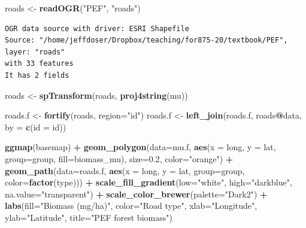\documentclass[
]{krantz}
\makeatletter
\newenvironment{Shaded}{\begin{snugshade}}{\end{snugshade}}
\newcommand{\DataTypeTok}[1]{\textcolor[rgb]{0.27,0.27,0.27}{#1}}
\newcommand{\FloatTok}[1]{\textcolor[rgb]{0.06,0.06,0.06}{#1}}
\newcommand{\KeywordTok}[1]{\textcolor[rgb]{0.27,0.27,0.27}{\textbf{#1}}}
\newcommand{\NormalTok}[1]{#1}
\newcommand{\OperatorTok}[1]{\textcolor[rgb]{0.43,0.43,0.43}{\textbf{#1}}}
\newcommand{\StringTok}[1]{\textcolor[rgb]{0.5,0.5,0.5}{#1}}
\newenvironment{kframe}{%
\medskip{}
\setlength{\fboxsep}{.8em}
 \def\at@end@of@kframe{}%
 \ifinner\ifhmode%
  \def\at@end@of@kframe{\end{minipage}}%
  \begin{minipage}{\columnwidth}%
 \fi\fi%
 \def\FrameCommand##1{\hskip\@totalleftmargin \hskip-\fboxsep
 \colorbox{shadecolor}{##1}\hskip-\fboxsep
     \hskip-\linewidth \hskip-\@totalleftmargin \hskip\columnwidth}%
 \MakeFramed {\advance\hsize-\width
   \@totalleftmargin\z@ \linewidth\hsize
   \@setminipage}}%
 {\par\unskip\endMakeFramed%
 \at@end@of@kframe}
\renewenvironment{Shaded}{\begin{kframe}}{\end{kframe}}
\makeatother
\begin{document}
\begin{Shaded}
\begin{Highlighting}[]
\NormalTok{roads \textless{}{-}}\StringTok{ }\KeywordTok{readOGR}\NormalTok{(}\StringTok{"PEF"}\NormalTok{, }\StringTok{"roads"}\NormalTok{)}
\end{Highlighting}
\end{Shaded}

\begin{verbatim}
OGR data source with driver: ESRI Shapefile 
Source: "/home/jeffdoser/Dropbox/teaching/for875-20/textbook/PEF", layer: "roads"
with 33 features
It has 2 fields
\end{verbatim}

\begin{Shaded}
\begin{Highlighting}[]
\NormalTok{roads \textless{}{-}}\StringTok{ }\KeywordTok{spTransform}\NormalTok{(roads, }\KeywordTok{proj4string}\NormalTok{(mu))}

\NormalTok{roads.f \textless{}{-}}\StringTok{ }\KeywordTok{fortify}\NormalTok{(roads, }\DataTypeTok{region=}\StringTok{"id"}\NormalTok{)}
\NormalTok{roads.f \textless{}{-}}\StringTok{ }\KeywordTok{left\_join}\NormalTok{(roads.f, roads}\OperatorTok{@}\NormalTok{data, }\DataTypeTok{by =} \KeywordTok{c}\NormalTok{(}\StringTok{\textquotesingle{}id\textquotesingle{}}\NormalTok{ =}\StringTok{ \textquotesingle{}id\textquotesingle{}}\NormalTok{))}

\KeywordTok{ggmap}\NormalTok{(basemap) }\OperatorTok{+}
\StringTok{    }\KeywordTok{geom\_polygon}\NormalTok{(}\DataTypeTok{data=}\NormalTok{mu.f, }\KeywordTok{aes}\NormalTok{(}\DataTypeTok{x =}\NormalTok{ long, }\DataTypeTok{y =}\NormalTok{ lat, }\DataTypeTok{group=}\NormalTok{group, }
                                \DataTypeTok{fill=}\NormalTok{biomass\_mu), }
                 \DataTypeTok{size=}\FloatTok{0.2}\NormalTok{, }\DataTypeTok{color=}\StringTok{"orange"}\NormalTok{) }\OperatorTok{+}
\StringTok{    }\KeywordTok{geom\_path}\NormalTok{(}\DataTypeTok{data=}\NormalTok{roads.f, }\KeywordTok{aes}\NormalTok{(}\DataTypeTok{x =}\NormalTok{ long, }\DataTypeTok{y =}\NormalTok{ lat, }
                                \DataTypeTok{group=}\NormalTok{group, }\DataTypeTok{color=}\KeywordTok{factor}\NormalTok{(type))) }\OperatorTok{+}
\StringTok{    }\KeywordTok{scale\_fill\_gradient}\NormalTok{(}\DataTypeTok{low=}\StringTok{"white"}\NormalTok{, }\DataTypeTok{high=}\StringTok{"darkblue"}\NormalTok{, }
                        \DataTypeTok{na.value=}\StringTok{"transparent"}\NormalTok{) }\OperatorTok{+}
\StringTok{    }\KeywordTok{scale\_color\_brewer}\NormalTok{(}\DataTypeTok{palette=}\StringTok{"Dark2"}\NormalTok{) }\OperatorTok{+}
\StringTok{    }\KeywordTok{labs}\NormalTok{(}\DataTypeTok{fill=}\StringTok{"Biomass (mg/ha)"}\NormalTok{, }\DataTypeTok{color=}\StringTok{"Road type"}\NormalTok{, }\DataTypeTok{xlab=}\StringTok{"Longitude"}\NormalTok{, }
         \DataTypeTok{ylab=}\StringTok{"Latitude"}\NormalTok{, }\DataTypeTok{title=}\StringTok{"PEF forest biomass"}\NormalTok{)}
\end{Highlighting}
\end{Shaded}
\end{document}
